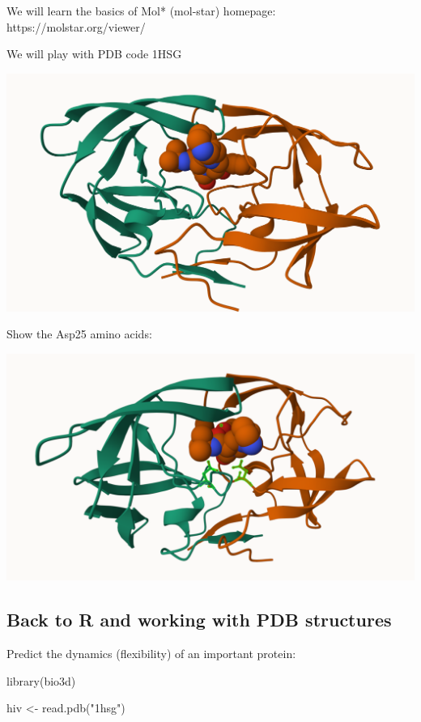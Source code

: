 \documentclass[
  letterpaper,
  DIV=11,
  numbers=noendperiod]{scrartcl}
\newenvironment{Shaded}{\begin{snugshade}}{\end{snugshade}}
\newcommand{\FunctionTok}[1]{\textcolor[rgb]{0.28,0.35,0.67}{#1}}
\newcommand{\NormalTok}[1]{\textcolor[rgb]{0.00,0.23,0.31}{#1}}
\newcommand{\OtherTok}[1]{\textcolor[rgb]{0.00,0.23,0.31}{#1}}
\newcommand{\StringTok}[1]{\textcolor[rgb]{0.13,0.47,0.30}{#1}}
\begin{document}
We will learn the basics of Mol* (mol-star) homepage:
https://molstar.org/viewer/

We will play with PDB code 1HSG

\includegraphics{1HSG.png}

Show the Asp25 amino acids:

\includegraphics{1HSG_D_HOH.png}

\hypertarget{back-to-r-and-working-with-pdb-structures}{%
\subsection{Back to R and working with PDB
structures}\label{back-to-r-and-working-with-pdb-structures}}

Predict the dynamics (flexibility) of an important protein:

\begin{Shaded}
\begin{Highlighting}[]
\FunctionTok{library}\NormalTok{(bio3d)}

\NormalTok{hiv }\OtherTok{\textless{}{-}} \FunctionTok{read.pdb}\NormalTok{(}\StringTok{"1hsg"}\NormalTok{)}
\end{Highlighting}
\end{Shaded}
\end{document}
